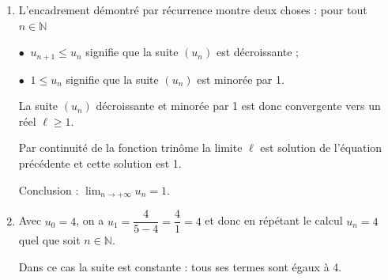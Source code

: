 \documentclass[10pt]{article}
\providecommand{\N}{\mathbb{N}}
\begin{document}
\begin{enumerate}
\begin{enumerate}
On a pour $x < 5$, \: $f(x) = x \iff \dfrac{4}{5 - x} = x \iff 4 = x(5 - x) \iff 4 = 5x - x^2 \iff x^2 - 5x + 4 = 0$.
		\item 
		Résoudre $f(x) = x$ dans l'intervalle $]-\infty~;~5[$, revient d'après la question précédente à résoudre l'équation du second degré $x^2 - 5x + 4 = 0$.
		
		Les racines de cette équation 1 et 4 sont évidentes (sinon on calcule le déterminant), donc :

$x^2 - 5x + 4 = 0 \iff (x - 1)( x - 4) = 0 \iff \left\{\begin{array}{l c l}
x - 1			&=&0\\
				&\text{ou}&\\
x - 4			&=&0
\end{array}\right. \iff \left\{\begin{array}{l c l}
x 	&=			&1\\
	&\text{ou}	&\\
x 	&=			& 4
\end{array}\right.$

la solution 4 n'est pas vraisemblable puisque $x < 4$, on a donc $S = \{1\}$.
	\end{enumerate}	
\item 


L'encadrement démontré par récurrence montre deux choses : pour tout $n \in \N$

$\bullet~$ $u_{n+1} \leqslant u_n$ signifie que la suite $\left(u_n\right)$ est décroissante ;

$\bullet~$ $1\leqslant u_n$ signifie que la suite $\left(u_n\right)$ est minorée par 1.

La suite $\left(u_n\right)$ décroissante et minorée par 1 est donc convergente vers un réel $\ell \geqslant 1$.

Par continuité de la fonction trinôme la limite $\ell$ est solution de l'équation précédente et cette solution est 1.

Conclusion : $\displaystyle\lim_{n \to + \infty} u_n = 1$.
\item 
Avec $u_0 = 4$, on a $u_1 = \dfrac{4}{5 - 4} =\dfrac41 = 4$ et donc en répétant le calcul $u_n = 4$ quel que soit $n \in \N$.

Dans ce cas la suite est constante : tous ses termes sont égaux à 4.
\end{enumerate}
\end{document}
